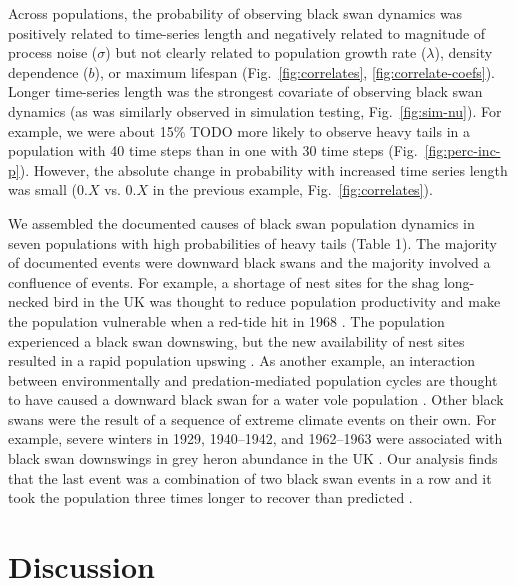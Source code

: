 Across populations, the probability of observing black swan dynamics was
positively related to time-series length and negatively related to magnitude of
process noise ($\sigma$) but not clearly related to population growth rate
($\lambda$), density dependence ($b$), or maximum lifespan
(Fig.~\ref{fig:correlates}, \ref{fig:correlate-coefs}). Longer time-series
length was the strongest covariate of observing black swan dynamics (as was
similarly observed in simulation testing, Fig.~\ref{fig:sim-nu}). For example,
we were about 15\% TODO more likely to observe heavy tails in a population with
40 time steps than in one with 30 time steps (Fig.~\ref{fig:perc-inc-p}).
However, the absolute change in probability with increased time series length
was small ($0.X$ vs. $0.X$ in the previous example, Fig.~\ref{fig:correlates}).

We assembled the documented causes of black swan population dynamics in seven
populations with high probabilities of heavy tails (Table 1). The majority of
documented events were downward black swans and the majority involved
a confluence of events. For example, a shortage of nest sites for the shag
long-necked bird in the UK was thought to reduce population productivity and
make the population vulnerable when a red-tide hit in 1968 \citep{potts1980}.
The population experienced a black swan downswing, but the new availability of
nest sites resulted in a rapid population upswing \citep{potts1980}. As
another example, an interaction between environmentally and predation-mediated
population cycles are thought to have caused a downward black swan for a water
vole population \citep{saucy1994}. Other black swans were the result of
a sequence of extreme climate events on their own. For example, severe winters
in 1929, 1940--1942, and 1962--1963 were associated with black swan downswings
in grey heron abundance in the UK \citep{stafford1971}. Our analysis finds
that the last event was a combination of two black swan events in a row and it
took the population three times longer to recover than predicted
\citep{stafford1971}.

\section{Discussion}

